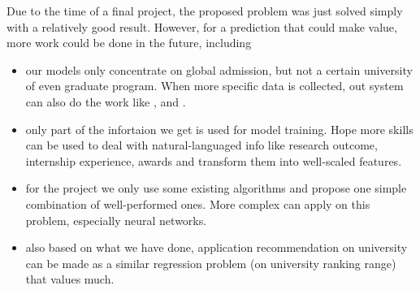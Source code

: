 \documentclass{article}
\begin{document}
Due to the time of a final project, the proposed problem was just solved simply with a relatively good result. However, for a prediction that could make value, more work could be done in the future, including

\begin{itemize}
    \item our models only concentrate on global admission, but not a certain university of even graduate program. When more specific data is collected, out system can also do the work like \cite{bruggink1996statistical}, \cite{moore1998expert} and \cite{gupta2016will}.
    \item only part of the infortaion we get is used for model training. Hope more skills can be used to deal with natural-languaged info like research outcome, internship experience, awards and transform them into well-scaled features.
    \item for the project we only use some existing algorithms and propose one simple combination of well-performed ones. More complex can apply on this problem, especially neural networks.
    \item also based on what we have done, application recommendation on university can be made as a similar regression problem (on university ranking range) that values much.
\end{itemize}





\end{document}
